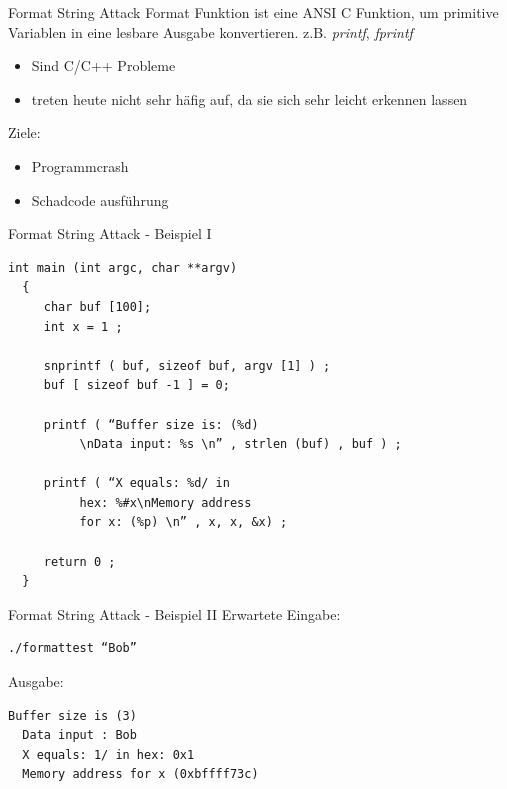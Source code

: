 \documentclass[10pt]{beamer}
\begin{document}
\begin{frame}[fragile]{Format String Attack}
  Format Funktion ist eine ANSI C Funktion, um primitive Variablen in eine lesbare Ausgabe konvertieren. z.B. \textit{printf}, \textit{fprintf}
  \begin{itemize}
    \item Sind C/C++ Probleme
    \item treten heute nicht sehr h\"afig auf, da sie sich sehr leicht erkennen lassen
  \end{itemize}

  Ziele:
  \begin{itemize}
    \item Programmcrash
    \item Schadcode ausf\"uhrung
  \end{itemize}
\end{frame}

\begin{frame}[fragile]{Format String Attack - Beispiel I}
  \begin{lstlisting}[style=CStyle]
  int main (int argc, char **argv)
  {
     char buf [100];
     int x = 1 ;

     snprintf ( buf, sizeof buf, argv [1] ) ;
     buf [ sizeof buf -1 ] = 0;

     printf ( “Buffer size is: (%d)
          \nData input: %s \n” , strlen (buf) , buf ) ;

     printf ( “X equals: %d/ in
          hex: %#x\nMemory address
          for x: (%p) \n” , x, x, &x) ;

     return 0 ;
  }
  \end{lstlisting}
\end{frame}

\begin{frame}[fragile]{Format String Attack - Beispiel II}
  Erwartete Eingabe:
  \begin{lstlisting}[style=BashStyle]
  ./formattest “Bob”
  \end{lstlisting}

  Ausgabe:
  \begin{lstlisting}[style=BashStyle]
  Buffer size is (3)
  Data input : Bob
  X equals: 1/ in hex: 0x1
  Memory address for x (0xbffff73c)
  \end{lstlisting}
\end{frame}
\end{document}
